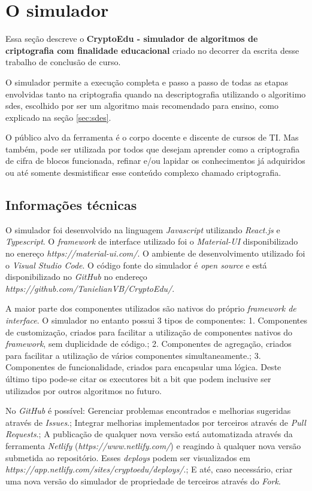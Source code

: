 \chapter{O simulador}
\label{char:ferrdesenvolvida}
Essa seção descreve o \textbf{CryptoEdu - simulador de algoritmos de criptografia com finalidade educacional} criado no decorrer da escrita desse trabalho de conclusão de curso.

O simulador permite a execução completa e passo a passo de todas as etapas envolvidas tanto na criptografia quando na descriptografia utilizando o algoritimo \acrfull{sdes}, escolhido por ser um algoritmo mais recomendado para ensino, como explicado na seção \ref{sec:sdes}.

O público alvo da ferramenta é o corpo docente e discente de cursos de TI. Mas também, pode ser utilizada por todos que desejam aprender como a criptografia de cifra de blocos funcionada, refinar e/ou lapidar os conhecimentos já adquiridos ou até somente desmistificar esse conteúdo complexo chamado criptografia.

\section{Informações técnicas}

O simulador foi desenvolvido na linguagem \textit{Javascript} utilizando \textit{React.js} e \textit{Typescript}. O \textit{framework} de interface utilizado foi o \textit{Material-UI} disponibilizado no enereço \textit{https://material-ui.com/}. O ambiente de desenvolvimento utilizado foi o \textit{Visual Studio Code}. O código fonte do simulador é \textit{open source} e está disponibilizado no \textit{GitHub} no endereço \textit{https://github.com/TanielianVB/CryptoEdu/}.

A maior parte dos componentes utilizados são nativos do próprio \textit{framework de interface}. O simulador no entanto possui 3 tipos de componentes: 1. Componentes de customização, criados para facilitar a utilização de componentes nativos do \textit{framework}, sem duplicidade de código.; 2. Componentes de agregação, criados para facilitar a utilização de vários componentes simultaneamente.; 3. Componentes de funcionalidade, criados para encapsular uma lógica. Deste último tipo pode-se citar os executores bit a bit que podem inclusive ser utilizados por outros algoritmos no futuro.

No \textit{GitHub} é possível: Gerenciar problemas encontrados e melhorias sugeridas através de \textit{Issues}.; Integrar melhorias implementados por terceiros através de \textit{Pull Requests}.; A publicação de qualquer nova versão está automatizada através da ferramenta \textit{Netlify} (\textit{https://www.netlify.com/}) e reagindo à qualquer nova versão submetida ao repositório. Esses \textit{deploys} podem ser visualizados em \textit{https://app.netlify.com/sites/cryptoedu/deploys/}.; E até, caso necessário, criar uma nova versão do simulador de propriedade de terceiros através do \textit{Fork}.

